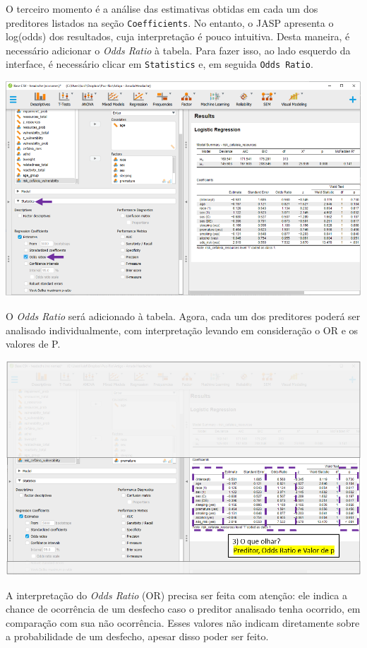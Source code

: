 \documentclass[
]{book}
\begin{document}
O terceiro momento é a análise das estimativas obtidas em cada um dos preditores listados na seção \texttt{Coefficients}. No entanto, o JASP apresenta o log(odds) dos resultados, cuja interpretação é pouco intuitiva. Desta maneira, é necessário adicionar o \emph{Odds Ratio} à tabela. Para fazer isso, ao lado esquerdo da interface, é necessário clicar em \texttt{Statistics} e, em seguida \texttt{Odds\ Ratio}.

\includegraphics{./img/cap_logistica_resultado_3.png}

O \emph{Odds Ratio} será adicionado à tabela. Agora, cada um dos preditores poderá ser analisado individualmente, com interpretação levando em consideração o OR e os valores de P.

\includegraphics{./img/cap_logistica_resultado_4.png}

A interpretação do \emph{Odds Ratio} (OR) precisa ser feita com atenção: ele indica a chance de ocorrência de um desfecho caso o preditor analisado tenha ocorrido, em comparação com sua não ocorrência. Esses valores não indicam diretamente sobre a probabilidade de um desfecho, apesar disso poder ser feito.
\end{document}
